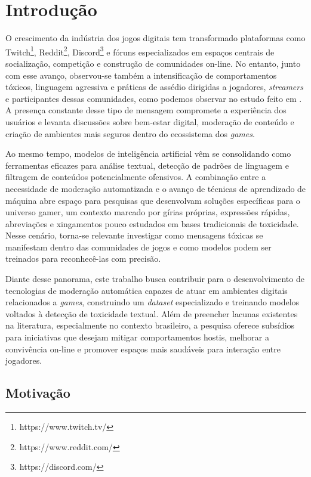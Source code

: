 \documentclass{eic-bcc-tcc}
\begin{document}
\chapter{Introdução}
\label{cha:introducao}

O crescimento da indústria dos jogos digitais tem transformado plataformas como Twitch\footnote{https://www.twitch.tv/}, Reddit\footnote{https://www.reddit.com/}, Discord\footnote{https://discord.com/} e fóruns especializados em espaços centrais de socialização, competição e construção de comunidades on-line. No entanto, junto com esse avanço, observou-se também a intensificação de comportamentos tóxicos, linguagem agressiva e práticas de assédio dirigidas a jogadores, \textit{streamers} e participantes dessas comunidades, como podemos observar no estudo feito em \cite{gam3sgg}. A presença constante desse tipo de mensagem compromete a experiência dos usuários e levanta discussões sobre bem-estar digital, moderação de conteúdo e criação de ambientes mais seguros dentro do ecossistema dos \textit{games}.

Ao mesmo tempo, modelos de inteligência artificial vêm se consolidando como ferramentas eficazes para análise textual, detecção de padrões de linguagem e filtragem de conteúdos potencialmente ofensivos. A combinação entre a necessidade de moderação automatizada e o avanço de técnicas de aprendizado de máquina abre espaço para pesquisas que desenvolvam soluções específicas para o universo gamer, um contexto marcado por gírias próprias, expressões rápidas, abreviações e xingamentos pouco estudados em bases tradicionais de toxicidade. Nesse cenário, torna-se relevante investigar como mensagens tóxicas se manifestam dentro das comunidades de jogos e como modelos podem ser treinados para reconhecê-las com precisão.

Diante desse panorama, este trabalho busca contribuir para o desenvolvimento de tecnologias de moderação automática capazes de atuar em ambientes digitais relacionados a \textit{games}, construindo um \textit{dataset} especializado e treinando modelos voltados à detecção de toxicidade textual. Além de preencher lacunas existentes na literatura, especialmente no contexto brasileiro, a pesquisa oferece subsídios para iniciativas que desejam mitigar comportamentos hostis, melhorar a convivência on-line e promover espaços mais saudáveis para interação entre jogadores.

\section{Motivação}
\end{document}
